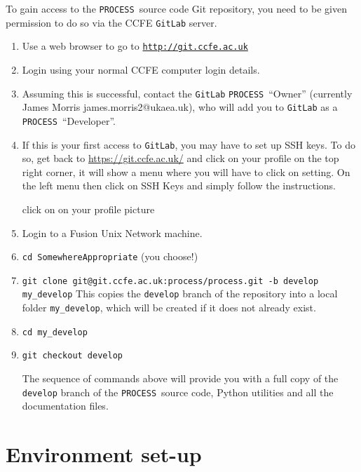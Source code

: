 \documentclass[11pt,a4paper]{report}
\newcommand{\process}{\mbox{\texttt{PROCESS}}}
\begin{document}
To gain access to the \process\ source code Git repository, you need
to be given permission to do so via the CCFE \texttt{GitLab} server.
\begin{enumerate}
	
	\item Use a web browser to go to
	\href{http://git.ccfe.ac.uk}{\texttt{http://git.ccfe.ac.uk}}
	
	\item Login using your normal CCFE computer login details.
	
	\item Assuming this is successful, contact the \texttt{GitLab} \process\
	``Owner'' (currently James Morris james.morris2@ukaea.uk), who will add you to \texttt{GitLab} as a \process\ ``Developer''.
	
	\item If this is your first access to \texttt{GitLab}, you may have to set up
	SSH keys. To do so, get back to \url{https://git.ccfe.ac.uk/} and click on your
	profile on the top right corner, it will show a menu where you will have to click on
	setting. On the left menu then click on SSH Keys and simply follow the instructions.
	
	click on on your profile picture 
	
	\item Login to a Fusion Unix Network machine.
	
	\item \texttt{cd SomewhereAppropriate} (you choose!)
	
	\item
	\texttt{git clone git@git.ccfe.ac.uk:process/process.git -b develop my\_develop}
	This copies the \texttt{develop} branch of the repository into a local folder \texttt{my\_develop}, which will be created if it does not already exist.
	\item \texttt{cd my\_develop}
	
	\item \texttt{git checkout develop}
	
	The sequence of commands above will provide you with a full copy of the \texttt{develop} branch of the \process\ source code, Python utilities and all
	the documentation files.
	
\end{enumerate}


\section{Environment set-up}
\label{sec:run_environment_dev}
\end{document}
